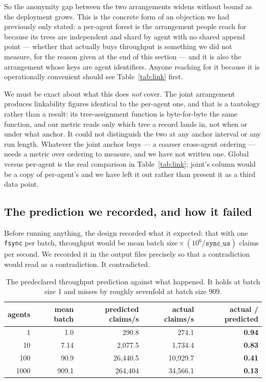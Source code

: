 \documentclass[11pt]{article}
\begin{document}
So the anonymity gap between the two arrangements widens without bound as
the deployment grows. This is the concrete form of an objection we had
previously only stated: a per-agent forest is the arrangement people reach
for because its trees are independent and shard by agent with no shared
append point --- whether that actually buys throughput is something we did
not measure, for the reason given at the end of this section --- and it is
also the arrangement whose keys are agent identifiers. Anyone reaching for
it because it is operationally convenient should see Table~\ref{tab:link}
first.

We must be exact about what this does \emph{not} cover. The joint arrangement
produces linkability figures identical to the per-agent one, and that is a
tautology rather than a result: its tree-assignment function is byte-for-byte
the same function, and our metric reads only which tree a record lands in, not
when or under what anchor. It could not distinguish the two at any anchor
interval or any run length. Whatever the joint anchor buys --- a coarser
cross-agent ordering --- needs a metric over ordering to measure, and we have
not written one. Global versus per-agent is the real comparison in
Table~\ref{tab:link}; joint's column would be a copy of per-agent's and we have
left it out rather than present it as a third data point.

\subsection{The prediction we recorded, and how it failed}

Before running anything, the design recorded what it expected: that with one
\texttt{fsync} per batch, throughput would be
$\text{mean batch size} \times (10^6 / \texttt{sync\_us})$ claims per second.
We recorded it in the output files precisely so that a contradiction would read
as a contradiction. It contradicted.

\begin{table}[htbp]
\centering
\small
\begin{tabular}{r r r r r}
\toprule
agents & mean batch & predicted claims/s & actual claims/s & actual / predicted \\
\midrule
1    & 1.0   & 290.8      & 274.1      & \textbf{0.94} \\
10   & 7.14  & 2{,}077.5   & 1{,}734.4   & \textbf{0.83} \\
100  & 90.9  & 26{,}440.5  & 10{,}929.7  & \textbf{0.41} \\
1000 & 909.1 & 264{,}404   & 34{,}566.1  & \textbf{0.13} \\
\bottomrule
\end{tabular}
\caption{The predeclared throughput prediction against what happened. It
holds at batch size 1 and misses by roughly sevenfold at batch size 909.}
\label{tab:pred}
\end{table}
\end{document}
